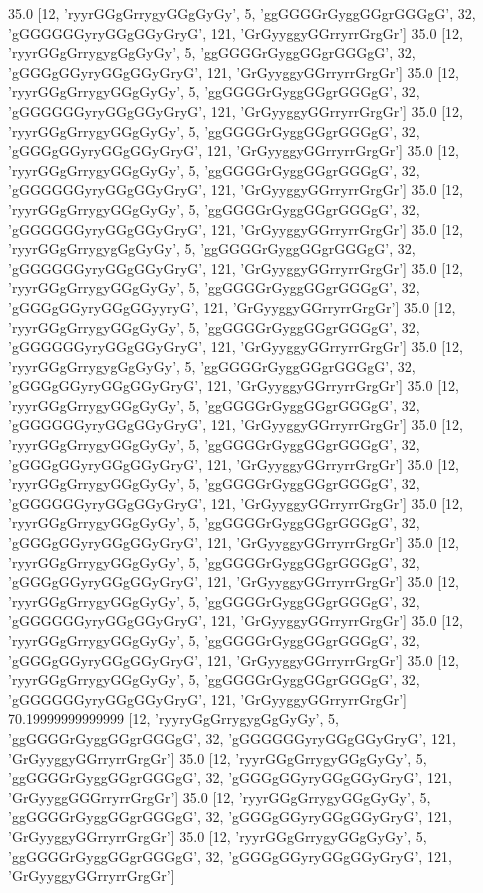 35.0 [12, 'ryyrGGgGrrygyGGgGyGy', 5, 'ggGGGGrGyggGGgrGGGgG', 32, 'gGGGGGGyryGGgGGyGryG', 121, 'GrGyyggyGGrryrrGrgGr']
35.0 [12, 'ryyrGGgGrrygygGgGyGy', 5, 'ggGGGGrGyggGGgrGGGgG', 32, 'gGGGgGGyryGGgGGyGryG', 121, 'GrGyyggyGGrryrrGrgGr']
35.0 [12, 'ryyrGGgGrrygyGGgGyGy', 5, 'ggGGGGrGyggGGgrGGGgG', 32, 'gGGGGGGyryGGgGGyGryG', 121, 'GrGyyggyGGrryrrGrgGr']
35.0 [12, 'ryyrGGgGrrygyGGgGyGy', 5, 'ggGGGGrGyggGGgrGGGgG', 32, 'gGGGgGGyryGGgGGyGryG', 121, 'GrGyyggyGGrryrrGrgGr']
35.0 [12, 'ryyrGGgGrrygyGGgGyGy', 5, 'ggGGGGrGyggGGgrGGGgG', 32, 'gGGGGGGyryGGgGGyGryG', 121, 'GrGyyggyGGrryrrGrgGr']
35.0 [12, 'ryyrGGgGrrygyGGgGyGy', 5, 'ggGGGGrGyggGGgrGGGgG', 32, 'gGGGGGGyryGGgGGyGryG', 121, 'GrGyyggyGGrryrrGrgGr']
35.0 [12, 'ryyrGGgGrrygygGgGyGy', 5, 'ggGGGGrGyggGGgrGGGgG', 32, 'gGGGGGGyryGGgGGyGryG', 121, 'GrGyyggyGGrryrrGrgGr']
35.0 [12, 'ryyrGGgGrrygyGGgGyGy', 5, 'ggGGGGrGyggGGgrGGGgG', 32, 'gGGGgGGyryGGgGGyyryG', 121, 'GrGyyggyGGrryrrGrgGr']
35.0 [12, 'ryyrGGgGrrygyGGgGyGy', 5, 'ggGGGGrGyggGGgrGGGgG', 32, 'gGGGGGGyryGGgGGyGryG', 121, 'GrGyyggyGGrryrrGrgGr']
35.0 [12, 'ryyrGGgGrrygygGgGyGy', 5, 'ggGGGGrGyggGGgrGGGgG', 32, 'gGGGgGGyryGGgGGyGryG', 121, 'GrGyyggyGGrryrrGrgGr']
35.0 [12, 'ryyrGGgGrrygyGGgGyGy', 5, 'ggGGGGrGyggGGgrGGGgG', 32, 'gGGGGGGyryGGgGGyGryG', 121, 'GrGyyggyGGrryrrGrgGr']
35.0 [12, 'ryyrGGgGrrygyGGgGyGy', 5, 'ggGGGGrGyggGGgrGGGgG', 32, 'gGGGgGGyryGGgGGyGryG', 121, 'GrGyyggyGGrryrrGrgGr']
35.0 [12, 'ryyrGGgGrrygyGGgGyGy', 5, 'ggGGGGrGyggGGgrGGGgG', 32, 'gGGGGGGyryGGgGGyGryG', 121, 'GrGyyggyGGrryrrGrgGr']
35.0 [12, 'ryyrGGgGrrygyGGgGyGy', 5, 'ggGGGGrGyggGGgrGGGgG', 32, 'gGGGgGGyryGGgGGyGryG', 121, 'GrGyyggyGGrryrrGrgGr']
35.0 [12, 'ryyrGGgGrrygyGGgGyGy', 5, 'ggGGGGrGyggGGgrGGGgG', 32, 'gGGGgGGyryGGgGGyGryG', 121, 'GrGyyggyGGrryrrGrgGr']
35.0 [12, 'ryyrGGgGrrygyGGgGyGy', 5, 'ggGGGGrGyggGGgrGGGgG', 32, 'gGGGGGGyryGGgGGyGryG', 121, 'GrGyyggyGGrryrrGrgGr']
35.0 [12, 'ryyrGGgGrrygyGGgGyGy', 5, 'ggGGGGrGyggGGgrGGGgG', 32, 'gGGGgGGyryGGgGGyGryG', 121, 'GrGyyggyGGrryrrGrgGr']
35.0 [12, 'ryyrGGgGrrygyGGgGyGy', 5, 'ggGGGGrGyggGGgrGGGgG', 32, 'gGGGGGGyryGGgGGyGryG', 121, 'GrGyyggyGGrryrrGrgGr']
70.19999999999999 [12, 'ryyryGgGrrygygGgGyGy', 5, 'ggGGGGrGyggGGgrGGGgG', 32, 'gGGGGGGyryGGgGGyGryG', 121, 'GrGyyggyGGrryrrGrgGr']
35.0 [12, 'ryyrGGgGrrygyGGgGyGy', 5, 'ggGGGGrGyggGGgrGGGgG', 32, 'gGGGgGGyryGGgGGyGryG', 121, 'GrGyyggGGGrryrrGrgGr']
35.0 [12, 'ryyrGGgGrrygyGGgGyGy', 5, 'ggGGGGrGyggGGgrGGGgG', 32, 'gGGGgGGyryGGgGGyGryG', 121, 'GrGyyggyGGrryrrGrgGr']
35.0 [12, 'ryyrGGgGrrygyGGgGyGy', 5, 'ggGGGGrGyggGGgrGGGgG', 32, 'gGGGgGGyryGGgGGyGryG', 121, 'GrGyyggyGGrryrrGrgGr']
